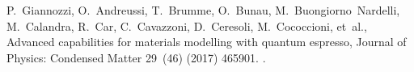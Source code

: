\documentclass[a4paper,12pt]{report}
\begin{document}
\begin{thebibliography}{00}
P.~Giannozzi, O.~Andreussi, T.~Brumme, O.~Bunau, M.~Buongiorno~Nardelli,
  M.~Calandra, R.~Car, C.~Cavazzoni, D.~Ceresoli, M.~Cococcioni, et~al.,
  Advanced capabilities for materials modelling with quantum espresso, Journal
  of Physics: Condensed Matter 29~(46) (2017) 465901.
\newblock \href {https://doi.org/10.1088/1361-648X/aa8f79}
  {}.
%
%
%
%
%
%
%
%
%

\end{thebibliography}
\end{document}
